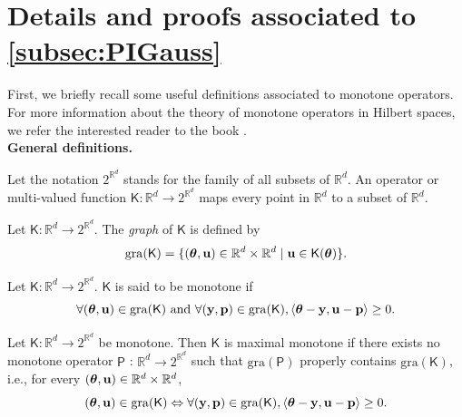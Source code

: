 \documentclass[nohypdvips,onefignum,onetabnum]{siamart171218}
\begin{document}
\section{Details and proofs associated to \cref{subsec:PIGauss}}
\label{appendix_sec_2_subsec_PPA}
First, we briefly recall some useful definitions associated to monotone operators.
For more information about the theory of monotone operators in Hilbert spaces, we refer the interested reader to the book \cite{Bauschke2017}.\\[0.5em]

\noindent\textbf{General definitions.}

\begin{definition}[Operator]
  Let the notation $2^{\mathbb{R}^d}$ stands for the family of all subsets of $\mathbb{R}^d$.
  An operator or multi-valued function $\mathsf{K}: \mathbb{R}^d \rightarrow 2^{\mathbb{R}^d}$ maps every point in $\mathbb{R}^d$ to a subset of $\mathbb{R}^d$.
\end{definition}

\begin{definition}[Graph]
  Let $\mathsf{K}: \mathbb{R}^d \rightarrow 2^{\mathbb{R}^d}$.
  The \textit{graph} of $\mathsf{K}$ is defined by
  \begin{equation}
    \mathrm{gra}(\mathsf{K}) = \{(\boldsymbol{\theta},\mathbf{u}) \in \mathbb{R}^d \times \mathbb{R}^d \mid \mathbf{u} \in \mathsf{K}(\boldsymbol{\theta})\}.
  \end{equation}
\end{definition}

\begin{definition}
  Let $\mathsf{K}: \mathbb{R}^d \rightarrow 2^{\mathbb{R}^d}$.
  $\mathsf{K}$ is said to be monotone if
  \begin{equation}
    \forall (\boldsymbol{\theta},\mathbf{u}) \in \mathrm{gra}(\mathsf{K}) \text{ and } \forall (\mathbf{y},\mathbf{p}) \in \mathrm{gra}(\mathsf{K}), \langle \boldsymbol{\theta}-\mathbf{y} , \mathbf{u}-\mathbf{p}\rangle \geq 0.
  \end{equation}
\end{definition}

\begin{definition}
  Let $\mathsf{K}: \mathbb{R}^d \rightarrow 2^{\mathbb{R}^d}$ be monotone. 
  Then $\mathsf{K}$ is maximal monotone if there exists no monotone operator $\mathsf{P}$ : $\mathbb{R}^d \rightarrow 2^{\mathbb{R}^d}$ such that $\mathrm{gra}(\mathsf{P})$ properly contains $\mathrm{gra}(\mathsf{K})$, i.e., for every $(\boldsymbol{\theta},\mathbf{u}) \in \mathbb{R}^d \times \mathbb{R}^d$,
  \begin{equation}
    (\boldsymbol{\theta},\mathbf{u}) \in \mathrm{gra}(\mathsf{K}) \Leftrightarrow \forall (\mathbf{y},\mathbf{p}) \in \mathrm{gra}(\mathsf{K}), \langle \boldsymbol{\theta}-\mathbf{y} , \mathbf{u}-\mathbf{p}\rangle \geq 0.
  \end{equation}
\end{definition}
\end{document}
